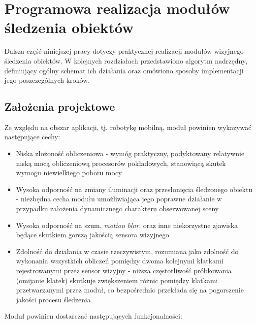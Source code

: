 \chapter{Programowa realizacja modułów śledzenia obiektów}
\label{cha:Programowa_realizacja_modulow_sledzenia_obiektow}

Dalsza część niniejszej pracy dotyczy praktycznej realizacji modułów wizyjnego śledzenia obiektów. W kolejnych rozdziałach przedstawiono algorytm nadrzędny, definiujący ogólny schemat ich działania oraz omówiono sposoby implementacji jego poszczególnych kroków.

\section{Założenia projektowe}
\label{sec:Zalozenia_projektowe}

Ze względu na obszar aplikacji, tj. robotykę mobilną, moduł powinien wykazywać następujące cechy:
\begin{itemize}

	\item Niska złożoność obliczeniowa - wymóg praktyczny, podyktowany relatywnie niską mocą obliczeniową procesorów pokładowych, stanowiącą skutek wymogu niewielkiego poboru mocy
	\item Wysoka odporność na zmiany iluminacji oraz przesłonięcia śledzonego obiektu - niezbędna cecha modułu umożliwiająca jego poprawne działanie w przypadku założenia dynamicznego charakteru obserwowanej sceny
	\item Wysoka odporność na szum, \textit{motion blur}, oraz inne niekorzystne zjawiska będące skutkiem gorszą jakością sensora wizyjnego
	\item Zdolność do działania w czasie rzeczywistym, rozumiana jako zdolność do wykonania wszystkich obliczeń pomiędzy dwoma kolejnymi klatkami rejestrowanymi przez sensor wizyjny - niższa częstotliwość próbkowania (omijanie klatek) skutkuje zwiększeniem różnic pomiędzy klatkami przetwarzanymi przez moduł, co bezpośrednio przekłada się na pogorszenie jakości procesu śledzenia 
	
\end{itemize}

Moduł powinien dostarczać następujących funkcjonalności:

